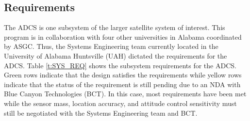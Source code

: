 \documentclass[conf]{new-aiaa}
\begin{document}
\subsection{Requirements}

The ADCS is one subsystem of the larger satellite system of interest. This program is in collaboration with four other universities in Alabama coordinated by ASGC. Thus, the Systems Engineering team currently located in the University of Alabama Huntsville (UAH) dictated the requirements for the ADCS. Table \ref{t:SYS_REQ} shows the subsystem requirements for the ADCS. Green rows indicate that the design satisfies the requirements while yellow rows indicate that the status of the requirement is still pending due to an NDA with Blue Canyon Technologies (BCT). In this case, most requirements have been met while the sensor mass, location accuracy, and attitude control sensitivity must still be negotiated with the Systems Engineering team and BCT.
\end{document}
